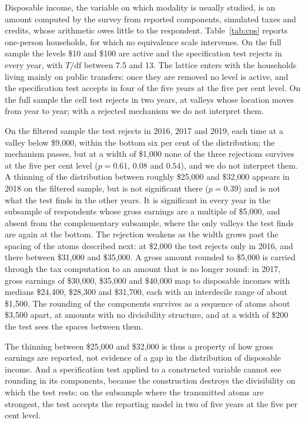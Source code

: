 Disposable income, the variable on which modality is usually studied, is an amount computed by the survey from reported components, simulated taxes and credits, whose arithmetic owes little to the respondent. Table~\ref{tab:cps} reports one-person households, for which no equivalence scale intervenes. On the full sample the levels \$10 and \$100 are active and the specification test rejects in every year, with $T/\mathrm{df}$ between 7.5 and 13. The lattice enters with the households living mainly on public transfers: once they are removed no level is active, and the specification test accepts in four of the five years at the five per cent level. On the full sample the cell test rejects in two years, at valleys whose location moves from year to year; with a rejected mechanism we do not interpret them.

On the filtered sample the test rejects in 2016, 2017 and 2019, each time at a valley below \$9{,}000, within the bottom six per cent of the distribution; the mechanism passes, but at a width of \$1{,}000 none of the three rejections survives at the five per cent level ($p=0.61$, $0.08$ and $0.54$), and we do not interpret them. A thinning of the distribution between roughly \$25{,}000 and \$32{,}000 appears in 2018 on the filtered sample, but is not significant there ($p=0.39$) and is not what the test finds in the other years. It is significant in every year in the subsample of respondents whose gross earnings are a multiple of \$5{,}000, and absent from the complementary subsample, where the only valleys the test finds are again at the bottom. The rejection weakens as the width grows past the spacing of the atoms described next: at \$2{,}000 the test rejects only in 2016, and there between \$31{,}000 and \$35{,}000. A gross amount rounded to \$5{,}000 is carried through the tax computation to an amount that is no longer round: in 2017, gross earnings of \$30{,}000, \$35{,}000 and \$40{,}000 map to disposable incomes with medians \$24{,}400, \$28{,}300 and \$31{,}700, each with an interdecile range of about \$1{,}500. The rounding of the components survives as a sequence of atoms about \$3{,}500 apart, at amounts with no divisibility structure, and at a width of \$200 the test sees the spaces between them.

The thinning between \$25{,}000 and \$32{,}000 is thus a property of how gross earnings are reported, not evidence of a gap in the distribution of disposable income. And a specification test applied to a constructed variable cannot see rounding in its components, because the construction destroys the divisibility on which the test rests: on the subsample where the transmitted atoms are strongest, the test accepts the reporting model in two of five years at the five per cent level.
